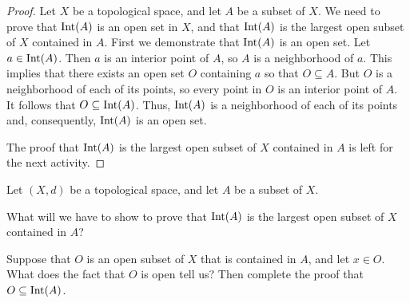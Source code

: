 \begin{proof} Let $X$ be a topological space, and let $A$ be a subset of $X$. We need to prove that $\text{Int}(A)$ is an open set in $X$, and that $\text{Int}(A)$ is the largest open subset of $X$ contained in $A$. First we demonstrate that $\text{Int}(A)$ is an open set. Let $a \in \text{Int}(A)$. Then $a$ is an interior point of $A$, so $A$ is a neighborhood of $a$. This implies that there exists an open set $O$ containing $a$ so that $O \subseteq A$. But $O$ is a neighborhood of each of its points, so every point in $O$ is an interior point of $A$. It follows that $O \subseteq \text{Int}(A)$. Thus, $\text{Int}(A)$ is a neighborhood of each of its points and, consequently, $\text{Int}(A)$ is an open set. 

The proof that $\text{Int}(A)$ is the largest open subset of $X$ contained in $A$ is left for the next activity.
\end{proof}

\begin{activity} Let $(X,d)$ be a topological space, and let $A$ be a subset of $X$. 
\ba
\item What will we have to show to prove that $\text{Int}(A)$ is the largest open subset of $X$ contained in $A$?

\item Suppose that $O$ is an open subset of $X$ that is contained in $A$, and let $x \in O$. What does the fact that $O$ is open tell us? Then complete the proof that $O \subseteq \text{Int}(A)$.

\ea

\end{activity}

\begin{comment}

\ActivitySolution

\ba
\item To prove that $\Int(A)$ is the largest open subset of $X$ contained in $A$ we need to prove that any open subset of $X$ that is contained in $A$ is a subset of $\Int(A)$.

\item Suppose that $O$ is an open subset of $X$ that is contained in $A$, and let $x \in O$. Since $O$ is a neighborhood of $x$, it follows that $A$ is a neighborhood of $x$ and $x \in \Int(A)$. It follows that $O \subseteq \Int(A)$ and $\Int(A)$ is the largest open subset of $X$ contained in $A$. 

\ea

\end{comment}

